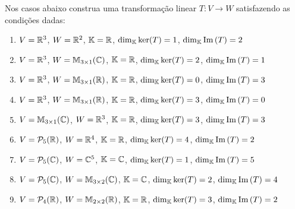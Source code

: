 \documentclass[12pt]{exam}
\begin{document}
\begin{exercicio}
    Nos casos abaixo construa uma transformação linear $T : V \to W$ satisfazendo as condições dadas:
    \begin{enumerate}[label={\alph*})]
        \item $V = \mathbb{R}^3$, $W = \mathbb{R}^2$, $\mathbb{K} = \mathbb{R}$, $\dim_{\mathbb{K}} \ker(T) = 1$, $\dim_{\mathbb{K}} {\rm Im\,}(T) = 2$

        \item $V = \mathbb{R}^3$, $W = \mathbb{M}_{3\times 1}(\mathbb{C})$, $\mathbb{K} = \mathbb{R}$, $\dim_{\mathbb{K}} \ker(T) = 2$, $\dim_{\mathbb{K}} {\rm Im\,}(T) = 1$

        \item $V = \mathbb{R}^3$, $W = \mathbb{M}_{3\times 1}(\mathbb{R})$, $\mathbb{K} = \mathbb{R}$, $\dim_{\mathbb{K}} \ker(T) = 0$, $\dim_{\mathbb{K}} {\rm Im\,}(T) = 3$

        \item $V = \mathbb{R}^3$, $W = \mathbb{M}_{3\times 1}(\mathbb{R})$, $\mathbb{K} = \mathbb{R}$, $\dim_{\mathbb{K}} \ker(T) = 3$, $\dim_{\mathbb{K}} {\rm Im\,}(T) = 0$

        \item $V = \mathbb{M}_{3\times 1}(\mathbb{C})$, $W = \mathbb{R}^3$, $\mathbb{K} = \mathbb{R}$, $\dim_{\mathbb{K}} \ker(T) = 3$, $\dim_{\mathbb{K}} {\rm Im\,}(T) = 3$

        \item $V = \mathcal{P}_5(\mathbb{R})$, $W = \mathbb{R}^4$, $\mathbb{K} = \mathbb{R}$, $\dim_{\mathbb{K}} \ker(T) = 4$, $\dim_{\mathbb{K}} {\rm Im\,}(T) = 2$

        \item $V = \mathcal{P}_5(\mathbb{C})$, $W = \mathbb{C}^5$, $\mathbb{K} = \mathbb{C}$, $\dim_{\mathbb{K}} \ker(T) = 1$, $\dim_{\mathbb{K}} {\rm Im\,}(T) = 5$

        \item $V = \mathcal{P}_5(\mathbb{C})$, $W = \mathbb{M}_{3\times 2}(\mathbb{C})$, $\mathbb{K} = \mathbb{C}$, $\dim_{\mathbb{K}} \ker(T) = 2$, $\dim_{\mathbb{K}} {\rm Im\,}(T) = 4$

        \item $V = \mathcal{P}_4(\mathbb{R})$, $W = \mathbb{M}_{2\times 2}(\mathbb{R})$, $\mathbb{K} = \mathbb{R}$, $\dim_{\mathbb{K}} \ker(T) = 3$, $\dim_{\mathbb{K}} {\rm Im\,}(T) = 2$
    \end{enumerate}
\end{exercicio}
\end{document}
